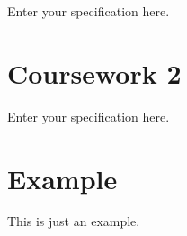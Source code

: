\documentclass[
  letterpaper,
  oneside]{book}
\numberwithin{equation}{section}
\numberwithin{figure}{section}
\theoremstyle{break}
\begin{document}

Enter your specification here.


\chapter*{\texorpdfstring{{Coursework
2}}{Coursework 2}}\label{coursework-2}


Enter your specification here.

\cleardoublepage
{}
{}
\appendix

\chapter{Example}\label{example}

This is just an example.


\backmatter
\end{document}
